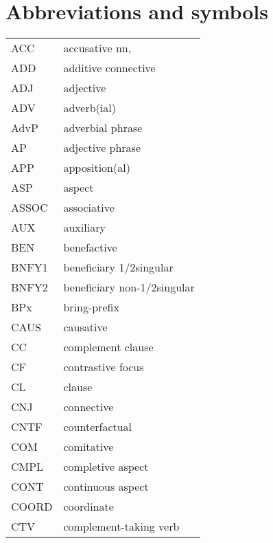 \section*{Abbreviations and symbols}
\begin{tabular}{ll}
ACC & accusative nn, \\
ADD & additive connective \\
ADJ & adjective \\
ADV & adverb(ial) \\
AdvP & adverbial phrase \\
AP & adjective phrase \\
APP & apposition(al) \\
ASP & aspect \\
ASSOC & associative \\
AUX & auxiliary \\
BEN & benefactive \\
BNFY1 & beneficiary 1/2singular \\
BNFY2 & beneficiary non-1/2singular \\
BPx & bring-prefix \\
CAUS & causative \\
CC & complement clause \\
CF & contrastive focus \\
CL & clause \\
CNJ & connective \\
CNTF & counterfactual \\
COM & comitative \\
CMPL & completive aspect \\
CONT & continuous aspect \\
COORD & coordinate \\
CTV & complement-taking verb \\
\end{tabular}
